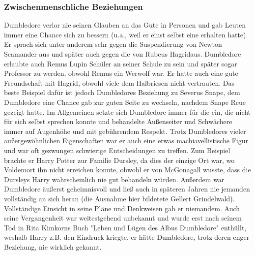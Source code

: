 \documentclass[a4paper, 10pt]{article}
\begin{document}
\subsubsection*{\large Zwischenmenschliche Beziehungen}
Dumbledore verlor nie seinen Glauben an das Gute in Personen und gab Leuten immer eine Chance sich zu bessern (u.a., weil er einst selbst eine erhalten hatte). Er sprach sich unter anderem sehr gegen die Suspendierung von Newton Scamander aus und später auch gegen die von Rubeus Hagridaus. Dumbledore erlaubte auch Remus Lupin Schüler an seiner Schule zu sein und später sogar Professor zu werden, obwohl Remus ein Werwolf war. Er hatte auch eine gute Freundschaft mit Hagrid, obwohl viele dem Halbriesen nicht vertrauten. Das beste Beispiel dafür ist jedoch Dumbledores Beziehung zu Severus Snape, dem Dumbledore eine Chance gab zur guten Seite zu wechseln, nachdem Snape Reue gezeigt hatte. Im Allgemeinen setzte sich Dumbledore immer für die ein, die nicht für sich selbst sprechen konnte und behandelte Außenseiter und Schwächere immer auf Augenhöhe und mit gebührendem Respekt.
\vspace{10pt}
\newline
Trotz Dumbledores vieler außergewöhnlichen Eigenschaften war er auch eine etwas machiavellistische Figur und war oft gezwungen schwierige Entscheidungen zu treffen. Zum Beispiel brachte er Harry Potter zur Familie Dursley, da dies der einzige Ort war, wo Voldemort ihn nicht erreichen konnte, obwohl er von McGonagall wusste, dass die Dursleys Harry wahrscheinlich nie gut behandeln würden.
\vspace{10pt}
\newline
Außerdem war Dumbledore äußerst geheimnisvoll und ließ auch in späteren Jahren nie jemanden vollständig an sich heran (die Ausnahme hier bildetete Gellert Grindelwald). Vollständige Einsicht in seine Pläne und Denkweisen gab er niemandem. Auch seine Vergangenheit war weitestgehend unbekannt und wurde erst nach seinem Tod in Rita Kimkorns Buch "Leben und Lügen des Albus Dumbledore" enthüllt, weshalb Harry z.B. den Eindruck kriegte, er hätte Dumbledore, trotz deren enger Beziehung, nie wirklich gekannt.
\end{document}
